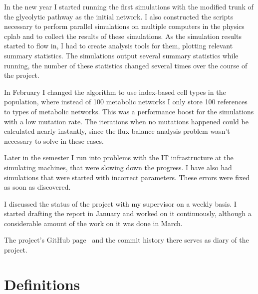 \documentclass[a4paper,12pt]{article}
\begin{document}
	In the new year I started running the first simulations with the modified trunk of the glycolytic pathway as the initial network. I also constructed the scripts necessary to perform parallel simulations on multiple computers in the physics cplab and to collect the results of these simulations. 
	As the simulation results started to flow in, I had to create analysis tools for them, plotting relevant summary statistics. The simulations output several summary statistics while running, the number of these statistics changed several times over the course of the project.

	In February I changed the algorithm to use index-based cell types in the population, where instead of 100 metabolic networks I only store 100 references to types of metabolic networks. This was a performance boost for the simulations with a low mutation rate. The iterations when no mutations happened could be calculated nearly instantly, since the flux balance analysis problem wasn't necessary to solve in these cases. 

	Later in the semester I run into problems with the IT infrastructure at the simulating machines, that were slowing down the progress. I have also had simulations that were started with incorrect parameters. These errors were fixed as soon as discovered. 

	I discussed the status of the project with my supervisor on a weekly basis. I started drafting the report in January and worked on it continuously, although a considerable amount of the work on it was done in March. 

	The project's GitHub page \cite{owngithub}~and the commit history there serves as diary of the project. 
	\cleardoublepage
	\section*{Definitions}
\end{document}

